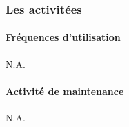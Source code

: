 \subsubsection{Les activitées}
\paragraph{Fréquences d'utilisation}
N.A.
\paragraph{Activité de maintenance}
N.A.